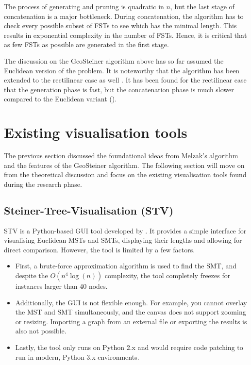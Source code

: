 \documentclass{l4proj}
\begin{document}
The process of generating and pruning is quadratic in $n$, but the last stage of concatenation is a major bottleneck. During concatenation, the algorithm has to check every possible subset of FSTs to see which has the minimal length. This results in exponential complexity in the number of FSTs. Hence, it is critical that as few FSTs as possible are generated in the first stage.

The discussion on the GeoSteiner algorithm above has so far assumed the Euclidean version of the problem. It is noteworthy that the algorithm has been extended to the rectilinear case as well \citep{rectilinear_geosteiner}. It has been found for the rectilinear case that the generation phase is fast, but the concatenation phase is much slower compared to the Euclidean variant (\citep{29ee725d11ac4584b72f7fe66c4326fa}).


\section{Existing visualisation tools}
\label{sec:existing_tools}
The previous section discussed the foundational ideas from Melzak's algorithm and the features of the GeoSteiner algorithm. The following section will move on from the theoretical discussion and focus on the existing visualisation tools found during the research phase.

\subsection{Steiner-Tree-Visualisation (STV)}
STV is a Python-based GUI tool developed by \cite{Steiner-Tree-Visualisation}. It provides a simple interface for visualising Euclidean MSTs and SMTs, displaying their lengths and allowing for direct comparison. However, the tool is limited by a few factors.
\begin{itemize}
    \item First, a brute-force approximation algorithm is used to find the SMT, and despite the ${O(n^4 \log(n))}$ complexity, the tool completely freezes for instances larger than 40 nodes.
    \item Additionally, the GUI is not flexible enough. For example, you cannot overlay the MST and SMT simultaneously, and the canvas does not support zooming or resizing. Importing a graph from an external file or exporting the results is also not possible.
    \item Lastly, the tool only runs on Python 2.x and would require code patching to run in modern, Python 3.x environments.
\end{itemize}
\end{document}
